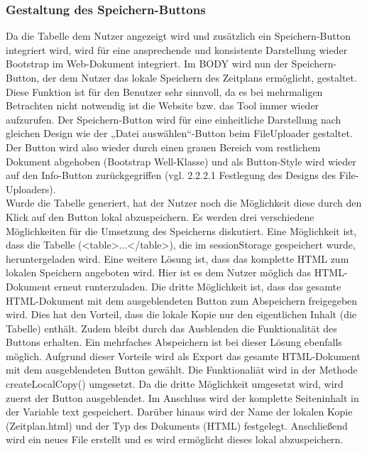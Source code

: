\subsubsection{Gestaltung des Speichern-Buttons}
Da die Tabelle dem Nutzer angezeigt wird und zusätzlich ein Speichern-Button integriert wird, wird für eine ansprechende und konsistente Darstellung wieder Bootstrap im Web-Dokument integriert. Im BODY wird nun der Speichern-Button, der dem Nutzer das lokale Speichern des Zeitplans ermöglicht, gestaltet. Diese Funktion ist für den Benutzer sehr sinnvoll, da es bei mehrmaligen Betrachten nicht notwendig ist die Website bzw. das Tool immer wieder aufzurufen. Der Speichern-Button wird für eine einheitliche Darstellung nach gleichen Design wie der „Datei auswählen“-Button beim FileUploader gestaltet. Der Button wird also wieder durch einen grauen Bereich vom restlichem Dokument abgehoben (Bootstrap Well-Klasse) und als Button-Style wird wieder auf den Info-Button zurückgegriffen (vgl. 2.2.2.1 Festlegung des Designs des File-Uploaders).\\
Wurde die Tabelle generiert, hat der Nutzer noch die Möglichkeit diese durch den Klick auf den Button lokal abzuspeichern. Es werden drei verschiedene Möglichkeiten für die Umsetzung des Speicherns diskutiert. Eine Möglichkeit ist, dass die Tabelle (<table>...</table>), die im sessionStorage gespeichert wurde, heruntergeladen wird. Eine weitere Lösung ist, dass das komplette HTML zum lokalen Speichern angeboten wird. Hier ist es dem Nutzer möglich das HTML-Dokument erneut runterzuladen. Die dritte Möglichkeit ist, dass das gesamte HTML-Dokument mit dem ausgeblendeten Button zum Abspeichern freigegeben wird. Dies hat den Vorteil, dass die lokale Kopie nur den eigentlichen Inhalt (die Tabelle) enthält. Zudem bleibt durch das Ausblenden die Funktionalität des Buttons erhalten. Ein mehrfaches Abspeichern ist bei dieser Lösung ebenfalls möglich. Aufgrund dieser Vorteile wird als Export das gesamte HTML-Dokument mit dem ausgeblendeten Button gewählt. 
Die Funktionaliät wird in der Methode createLocalCopy() umgesetzt. Da die dritte Möglichkeit umgesetzt wird, wird zuerst der Button ausgeblendet. Im Anschluss wird der komplette Seiteninhalt in der Variable text gespeichert. Darüber hinaus wird der Name der lokalen Kopie (Zeitplan.html) und der Typ des Dokuments (HTML) festgelegt. Anschließend wird ein neues File erstellt und es wird ermöglicht dieses lokal abzuspeichern.

